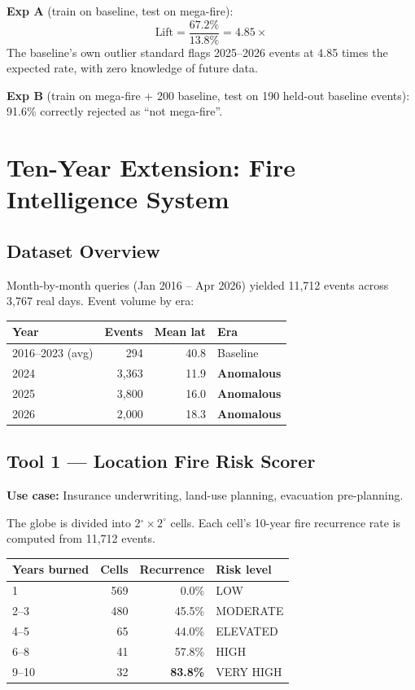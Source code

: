 \documentclass[12pt, letterpaper]{article}
\begin{document}
\noindent\textbf{Exp A} (train on baseline, test on mega-fire):
$$\text{Lift} = \frac{67.2\%}{13.8\%} = 4.85\times$$
The baseline's own outlier standard flags 2025--2026 events at 4.85 times
the expected rate, with zero knowledge of future data.

\noindent\textbf{Exp B} (train on mega-fire + 200 baseline, test on 190
held-out baseline events): 91.6\% correctly rejected as ``not mega-fire''.

\section{Ten-Year Extension: Fire Intelligence System}

\subsection{Dataset Overview}

Month-by-month queries (Jan 2016 -- Apr 2026) yielded 11,712 events across
3,767 real days. Event volume by era:

\begin{center}
\begin{tabular}{lrrl}
\toprule
Year & Events & Mean lat & Era \\
\midrule
2016--2023 (avg) & 294 & 40.8 & Baseline \\
2024 & 3,363 & 11.9 & \textbf{Anomalous} \\
2025 & 3,800 & 16.0 & \textbf{Anomalous} \\
2026 & 2,000 & 18.3 & \textbf{Anomalous} \\
\bottomrule
\end{tabular}
\end{center}

\subsection{Tool 1 --- Location Fire Risk Scorer}

\textbf{Use case:} Insurance underwriting, land-use planning,
evacuation pre-planning.

The globe is divided into 2$^\circ\!\times\!2^\circ$ cells. Each cell's
10-year fire recurrence rate is computed from 11,712 events.

\begin{center}
\begin{tabular}{lrrl}
\toprule
Years burned & Cells & Recurrence & Risk level \\
\midrule
1       & 569 &  0.0\% & LOW \\
2--3    & 480 & 45.5\% & MODERATE \\
4--5    &  65 & 44.0\% & ELEVATED \\
6--8    &  41 & 57.8\% & HIGH \\
9--10   &  32 & \textbf{83.8\%} & VERY HIGH \\
\bottomrule
\end{tabular}
\end{center}
\end{document}
